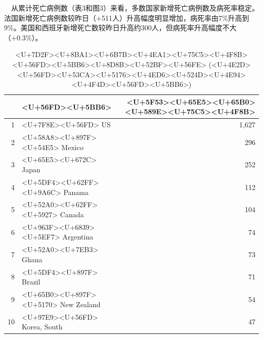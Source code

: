 \documentclass[
]{article}
\begin{document}
~~从累计死亡病例数（表3和图3）来看，多数国家新增死亡病例数及病死率稳定。法国新增死亡病例数较昨日（+511人）升高幅度明显增加，病死率由7\%升高到9\%。美国和西班牙新增死亡数较昨日升高约300人，但病死率升高幅度不大（+0.3\%）。

\begin{table}
    \begin{minipage}{.4\linewidth}
    \centering
    \captionsetup{justification=centering}
    \caption{<U+65E5><U+65B0><U+589E><U+786E><U+8BCA><U+75C5><U+4F8B><U+56FD><U+5BB6><U+8D8B><U+52BF><U+56FE> \newline(<U+4E2D><U+56FD><U+53CA><U+5176><U+4ED6><U+524D><U+4E94><U+4F4D><U+56FD><U+5BB6>)}
    \vspace{-0.5\baselineskip}
      \centering
    \captionsetup{justification=centering} \begin{table}[H]
\centering
\begin{tabular}{rlr}
\toprule
  & <U+56FD><U+5BB6> & <U+5F53><U+65E5><U+65B0><U+589E><U+75C5><U+4F8B>\\
\midrule
\rowcolor{gray!6}  1 & <U+7F8E><U+56FD> US & 1,627\\
2 & <U+58A8><U+897F><U+54E5> Mexico & 296\\
\rowcolor{gray!6}  3 & <U+65E5><U+672C> Japan & 252\\
4 & <U+5DF4><U+62FF><U+9A6C> Panama & 112\\
\rowcolor{gray!6}  5 & <U+52A0><U+62FF><U+5927> Canada & 104\\
6 & <U+963F><U+6839><U+5EF7> Argentina & 74\\
\rowcolor{gray!6}  7 & <U+52A0><U+7EB3> Ghana & 73\\
8 & <U+5DF4><U+897F> Brazil & 71\\
\rowcolor{gray!6}  9 & <U+65B0><U+897F><U+5170> New Zealand & 54\\
10 & <U+97E9><U+56FD> Korea, South & 47\\
\bottomrule
\end{tabular}
\end{table} \end{minipage}%
    \begin{minipage}{.4\linewidth}
    \centering
    \captionsetup{justification=centering}
     \caption{<U+7D2F><U+8BA1><U+6B7B><U+4EA1><U+75C5><U+4F8B><U+56FD><U+5BB6><U+8D8B><U+52BF><U+56FE> \newline(<U+4E2D><U+56FD><U+53CA><U+5176><U+4ED6><U+524D><U+4E94><U+4F4D><U+56FD><U+5BB6>)}
     \vspace{-0.5\baselineskip}
      \centering

\end{minipage}
\end{table}
\end{document}
